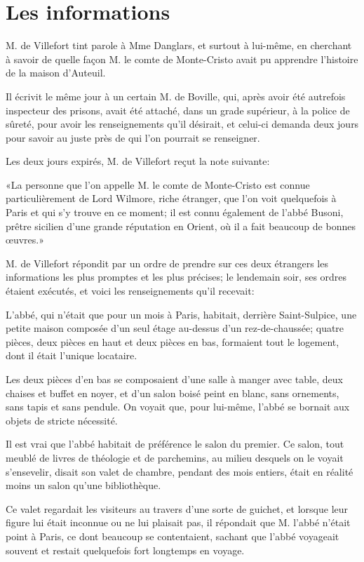 \chapter{Les informations} 

\lettrine{M}{.} de Villefort tint parole à Mme Danglars, et surtout à lui-même, en cherchant à savoir de quelle façon M. le comte de Monte-Cristo avait pu apprendre l'histoire de la maison d'Auteuil. 

Il écrivit le même jour à un certain M. de Boville, qui, après avoir été autrefois inspecteur des prisons, avait été attaché, dans un grade supérieur, à la police de sûreté, pour avoir les renseignements qu'il désirait, et celui-ci demanda deux jours pour savoir au juste près de qui l'on pourrait se renseigner. 

Les deux jours expirés, M. de Villefort reçut la note suivante: 

«La personne que l'on appelle M. le comte de Monte-Cristo est connue particulièrement de Lord Wilmore, riche étranger, que l'on voit quelquefois à Paris et qui s'y trouve en ce moment; il est connu également de l'abbé Busoni, prêtre sicilien d'une grande réputation en Orient, où il a fait beaucoup de bonnes œuvres.» 

M. de Villefort répondit par un ordre de prendre sur ces deux étrangers les informations les plus promptes et les plus précises; le lendemain soir, ses ordres étaient exécutés, et voici les renseignements qu'il recevait: 

L'abbé, qui n'était que pour un mois à Paris, habitait, derrière Saint-Sulpice, une petite maison composée d'un seul étage au-dessus d'un rez-de-chaussée; quatre pièces, deux pièces en haut et deux pièces en bas, formaient tout le logement, dont il était l'unique locataire. 

Les deux pièces d'en bas se composaient d'une salle à manger avec table, deux chaises et buffet en noyer, et d'un salon boisé peint en blanc, sans ornements, sans tapis et sans pendule. On voyait que, pour lui-même, l'abbé se bornait aux objets de stricte nécessité. 

Il est vrai que l'abbé habitait de préférence le salon du premier. Ce salon, tout meublé de livres de théologie et de parchemins, au milieu desquels on le voyait s'ensevelir, disait son valet de chambre, pendant des mois entiers, était en réalité moins un salon qu'une bibliothèque. 

Ce valet regardait les visiteurs au travers d'une sorte de guichet, et lorsque leur figure lui était inconnue ou ne lui plaisait pas, il répondait que M. l'abbé n'était point à Paris, ce dont beaucoup se contentaient, sachant que l'abbé voyageait souvent et restait quelquefois fort longtemps en voyage. 

